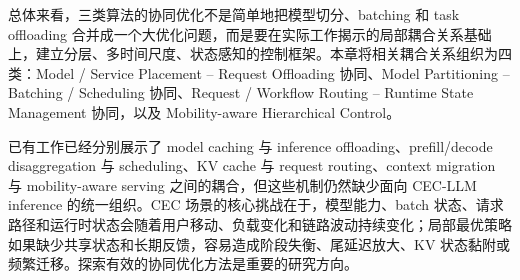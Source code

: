 总体来看，三类算法的协同优化不是简单地把模型切分、batching 和 task offloading 合并成一个大优化问题，而是要在实际工作揭示的局部耦合关系基础上，建立分层、多时间尺度、状态感知的控制框架。本章将相关耦合关系组织为四类：Model / Service Placement -- Request Offloading 协同、Model Partitioning -- Batching / Scheduling 协同、Request / Workflow Routing -- Runtime State Management 协同，以及 Mobility-aware Hierarchical Control。

已有工作已经分别展示了 model caching 与 inference offloading、prefill/decode disaggregation 与 scheduling、KV cache 与 request routing、context migration 与 mobility-aware serving 之间的耦合，但这些机制仍然缺少面向 CEC-LLM inference 的统一组织。CEC 场景的核心挑战在于，模型能力、batch 状态、请求路径和运行时状态会随着用户移动、负载变化和链路波动持续变化；局部最优策略如果缺少共享状态和长期反馈，容易造成阶段失衡、尾延迟放大、KV 状态黏附或频繁迁移。探索有效的协同优化方法是重要的研究方向。

